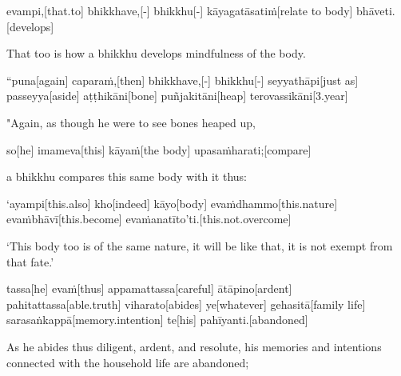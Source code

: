 \begin{samepage}
\begingl[glneveryline={\PaliGlossA,\PaliGlossB}]
evampi,[that.to] bhikkhave,[-] bhikkhu[-] kāyagatāsatiṁ[relate to body] bhāveti.[develops]
\endgl
\nopagebreak
\linespread{0.5}
\begin{spacin}{0.2}
{\PaliGlossFT That too is how a bhikkhu develops mindfulness of the body.}
\end{spacin}
\vskip 12pt
\end{samepage}
\vskip 0.05in
\begin{samepage}
\begingl[glneveryline={\PaliGlossA,\PaliGlossB}]
“puna[again] caparaṁ,[then] bhikkhave,[-] bhikkhu[-] seyyathāpi[just as] passeyya[aside] aṭṭhikāni[bone] puñjakitāni[heap] terovassikāni[3.year]
\endgl
\nopagebreak
\linespread{0.5}
\begin{spacin}{0.2}
{\PaliGlossFT "Again, as though he were to see bones heaped up,}
\end{spacin}
\vskip 12pt
\end{samepage}
\begin{samepage}
\begingl[glneveryline={\PaliGlossA,\PaliGlossB}]
so[he] imameva[this] kāyaṁ[the body] upasaṁharati;[compare]
\endgl
\nopagebreak
\linespread{0.5}
\begin{spacin}{0.2}
{\PaliGlossFT a bhikkhu compares this same body with it thus:}
\end{spacin}
\vskip 12pt
\end{samepage}
\begin{samepage}
\begingl[glneveryline={\PaliGlossA,\PaliGlossB}]
‘ayampi[this.also] kho[indeed] kāyo[body] evaṁdhammo[this.nature] evaṁbhāvī[this.become] evaṁanatīto’ti.[this.not.overcome]
\endgl
\nopagebreak
\linespread{0.5}
\begin{spacin}{0.2}
{\PaliGlossFT ‘This body too is of the same nature, it will be like that, it is not exempt from that fate.’}
\end{spacin}
\vskip 12pt
\end{samepage}
\begin{samepage}
\begingl[glneveryline={\PaliGlossA,\PaliGlossB}]
tassa[he] evaṁ[thus] appamattassa[careful] ātāpino[ardent] pahitattassa[able.truth] viharato[abides] ye[whatever] gehasitā[family life] sarasaṅkappā[memory.intention] te[his] pahīyanti.[abandoned]
\endgl
\nopagebreak
\linespread{0.5}
\begin{spacin}{0.2}
{\PaliGlossFT As he abides thus diligent, ardent, and resolute, his memories and intentions connected with the household life are abandoned;}
\end{spacin}
\vskip 12pt
\end{samepage}

